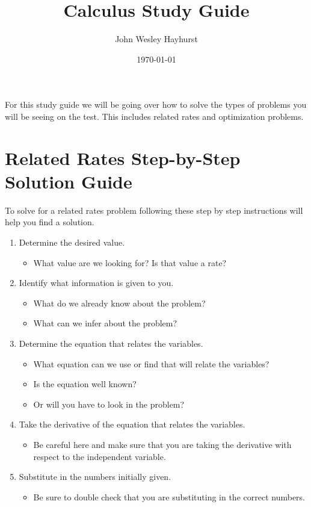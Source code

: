 \documentclass[12pt]{article}
\title{Calculus Study Guide}
\author{John Wesley Hayhurst}
\date{\today}
\begin{document}
  For this study guide we will be going over how to solve the types of problems you will be seeing on the test. This includes related rates and optimization problems.
  \section{Related Rates Step-by-Step Solution Guide}
    To solve for a related rates problem following these step by step instructions will help you find a solution.
    \begin{enumerate}
      \item Determine the desired value.
      \begin{itemize}
        \item What value are we looking for? Is that value a rate?
      \end{itemize}

      \item Identify what information is given to you.
      \begin{itemize}
        \item What do we already know about the problem?
        \item What can we infer about the problem?
      \end{itemize}

      \item Determine the equation that relates the variables.
      \begin{itemize}
        \item What equation can we use or find that will relate the variables?
        \item Is the equation well known?
        \item Or will you have to look in the problem?
      \end{itemize}

      \item Take the derivative of the equation that relates the variables.
      \begin{itemize}
        \item Be careful here and make sure that you are taking the derivative with respect to the independent variable.
      \end{itemize}

      \item Substitute in the numbers initially given.
      \begin{itemize}
        \item Be sure to double check that you are substituting in the correct numbers.
      \end{itemize}


\end{enumerate}
\end{document}

